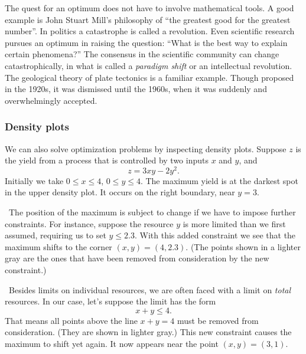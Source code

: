 {{{{{        The quest for an optimum does not have to involve mathematical tools.  A good example is John Stuart Mill's philosophy of ``the greatest good for the greatest number''.  In politics a catastrophe is called a revolution.  Even scientific research pursues an optimum in raising the question: ``What is the best way to explain certain phenomena?''  The consensus in the scientific community can change catastrophically, in what is called a {\em paradigm shift\/} or an intellectual revolution.  The geological theory of plate tectonics is a familiar example.  Though proposed in the 1920s, it was dismissed until the 1960s, when it was suddenly and overwhelmingly accepted.}

\subsubsection{Density plots}


\noindent
We can also solve optimization problems by inspecting density plots.  
\label{density1}
Suppose $z$ is the yield from a process that is controlled by two inputs $x$ and $y$, and 
        \[
z = 3xy - 2 y^2.
\]
Initially we take $0 \leq x \leq 4$, $0 \leq y \leq 4$.  The maximum yield is at the darkest spot in the upper density plot.  It occurs on the right boundary, near $y = 3$.

\quad \ The position of the maximum is subject to change if we have to impose further constraints.  For instance, suppose the resource $y$ is more limited than we first assumed, requiring us to set $y \leq 2.3$.  With this added constraint we see that the maximum shifts to the corner $(x, y) = (4, 2.3)$.  (The points shown in a lighter gray are the ones that have been removed from consideration by the new constraint.)

\quad \ Besides limits on individual resources, we are often faced with a limit on {\em total\/} resources.  In our case, let's suppose the limit has the form
        \[
x + y \leq 4.
\]
That means all points above the line $x + y = 4$ must be removed from consideration.  (They are shown in lighter gray.)  This new constraint causes the maximum to shift yet again.  It now appears near the point $(x, y) = (3, 1)$.
\vspace{2pt}

}}}}
